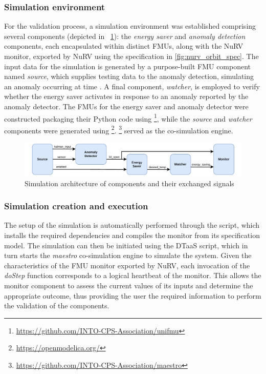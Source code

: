 \subsubsection{Simulation environment}
For the validation process, a simulation environment was established
comprising several components (depicted in ~\cref{fig:nurv_fmi_simulation}): the \textit{energy saver} and \textit{anomaly detection} components, each encapsulated within distinct FMUs, along with the NuRV monitor, exported by NuRV using the specification in \cref{fig:nurv_orbit_spec}. The input data for the simulation is generated by a purpose-built FMU component named \textit{source}, which supplies testing data to the anomaly detection, simulating an anomaly occurring at time . A final component, \textit{watcher}, is employed to verify whether the energy saver activates in response to an anomaly reported by the anomaly detector. The FMUs for the energy saver and anomaly detector were constructed packaging their Python code using \footnote{\url{https://github.com/INTO-CPS-Association/unifmu}}, while the \textit{source} and \textit{watcher} components were generated using \footnote{\url{https://openmodelica.org/}}. \footnote{\url{https://github.com/INTO-CPS-Association/maestro}} served as the co-simulation engine.%
%
\begin{figure}[ht]
	\centering
	\includegraphics[width=\columnwidth]{images/FMI-communication.pdf}
	\caption{Simulation architecture of components and their exchanged signals}
	\label{fig:nurv_fmi_simulation}
\end{figure}%
%
\subsubsection{Simulation creation and execution}
The setup of the simulation is automatically performed through the  script, which installs the required dependencies and compiles the monitor from its specification model. The simulation can then be initiated using the DTaaS  script, which in turn starts the \textit{maestro} co-simulation engine to simulate the system. Given the characteristics of the FMU monitor exported by NuRV, each invocation of the \textit{doStep} function corresponds to a logical heartbeat of the monitor. This allows the monitor component to assess the current values of its inputs and determine the appropriate outcome, thus providing the user the required information to perform the validation of the components.



